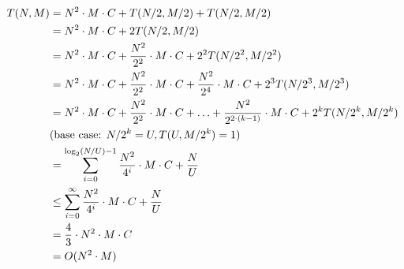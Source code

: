 \begin{align}
    T(N,M)&=N^2\cdot M \cdot C + T(N/2,M/2)+T(N/2,M/2) \notag \\
    &=N^2\cdot M \cdot C + 2T(N/2,M/2)  \notag \\
    &= N^2\cdot M \cdot C + \frac{ N^2}{2^2}\cdot M \cdot C + 2^2T(N/2^2,M/2^2)  \notag \\
    &= N^2\cdot M \cdot C + \frac{ N^2}{2^2}\cdot M   \cdot C + \frac{ N^2}{2^4}\cdot M \cdot C  + 2^3T(N/2^3,M/2^3)  \notag \\
    &= N^2\cdot M \cdot C + \frac{ N^2}{2^2}\cdot M \cdot C + \ldots + \frac{ N^2}{2^{2\cdot (k-1)}}\cdot M \cdot C  + 2^kT(N/2^k, M/2^k)  \notag \\
    & \text{(base case: $N/2^k = U, T(U,M/2^k)=1$)}  \notag \\ 
    &=\sum_{i=0}^{\log_2(N/U)-1} \frac{ N^2}{4^{i}}\cdot M \cdot C + \frac{N}{U}  \notag \\
    &\leq \sum_{i=0}^{\infty} \frac{ N^2}{4^i}\cdot M \cdot C+ \frac{N}{U}  \notag \\
    &= \frac{4}{3}\cdot N^2 \cdot M \cdot C \notag \\
    &=O(N^2\cdot M) \notag 
\end{align}


